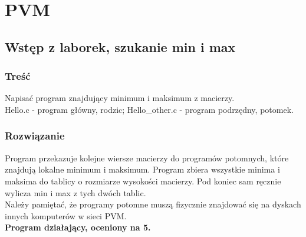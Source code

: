 \newpage
\section{PVM}
	\subsection{Wstęp z laborek, szukanie min i max}
		\subsubsection{Treść}
			Napisać program znajdujący minimum i maksimum z macierzy.\\
			Hello.c - program główny, rodzic; Hello\_other.c - program podrzędny, potomek.
		\subsubsection{Rozwiązanie}
			Program przekazuje kolejne wiersze macierzy do programów potomnych, które znajdują lokalne minimum i maksimum. Program zbiera wszystkie minima i maksima do tablicy o rozmiarze wysokości macierzy. Pod koniec sam ręcznie wylicza min i max z tych dwóch tablic.\\
			Należy pamiętać, że programy potomne muszą fizycznie znajdować się na dyskach innych komputerów w sieci PVM.\\
			\textbf{Program działający, oceniony na 5.}
